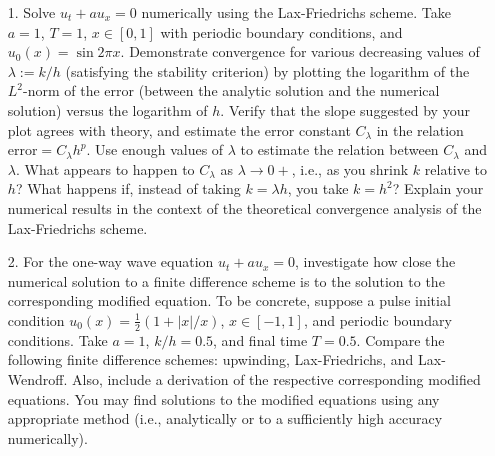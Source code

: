 \documentclass{article}
\providecommand{\abs}[1]{\left\lvert#1\right\rvert}
\begin{document}
\begin{itemize}

\item[1.] Solve $u_t + a u_x = 0$ numerically using the Lax-Friedrichs scheme. Take $a = 1$, $T = 1$, $x \in [0,1]$ with periodic boundary conditions, and $u_0(x) = \sin 2 \pi x$. Demonstrate convergence for various decreasing values of $\lambda := k/h$ (satisfying the stability criterion) by plotting the logarithm of the $L^2$-norm of the error (between the analytic solution and the numerical solution) versus the logarithm of $h$. Verify that the slope suggested by your plot agrees with theory, and estimate the error constant $C_{\lambda}$ in the relation $\text{error} = C_{\lambda} h^p$. Use enough values of $\lambda$ to estimate the relation between $C_{\lambda}$ and $\lambda$. What appears to happen to $C_{\lambda}$ as $\lambda \to 0+$, i.e., as you shrink $k$ relative to $h$? What happens if, instead of taking $k = \lambda h$, you take $k = h^2$? Explain your numerical results in the context of the theoretical convergence analysis of the Lax-Friedrichs scheme.

\item[2.] For the one-way wave equation $u_t + a u_x = 0$, investigate how close the numerical solution to a finite difference scheme is to the solution to the corresponding modified equation. To be concrete, suppose a pulse initial condition $u_0(x) = \frac{1}{2} \left( 1 + \abs{x}/x \right)$, $x \in [-1,1]$, and periodic boundary conditions. Take $a = 1$, $k/h = 0.5$, and final time $T = 0.5$. Compare the following finite difference schemes: upwinding, Lax-Friedrichs, and Lax-Wendroff. Also, include a derivation of the respective corresponding modified equations. You may find solutions to the modified equations using any appropriate method (i.e., analytically or to a sufficiently high accuracy numerically).

\end{itemize}
\end{document}
